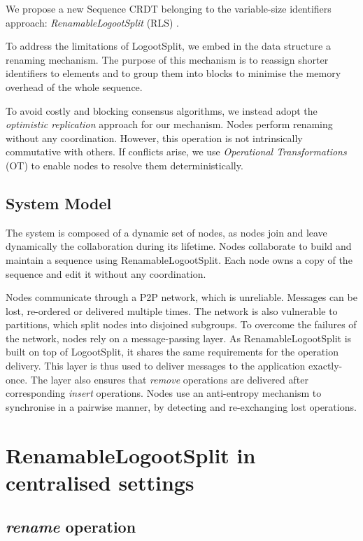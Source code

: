 \documentclass[10pt,journal,compsoc]{IEEEtran}
\begin{document}
We propose a new Sequence \ac{CRDT} belonging to the variable-size identifiers approach: \emph{RenamableLogootSplit} (RLS) \cite{nicolas:hal-01932552}.

To address the limitations of LogootSplit, we embed in the data structure a renaming mechanism.
The purpose of this mechanism is to reassign shorter identifiers to elements and to group them into blocks to minimise the memory overhead of the whole sequence.

To avoid costly and blocking consensus algorithms, we instead adopt the \emph{optimistic replication} \cite{10.1145/1057977.1057980} approach for our mechanism.
Nodes perform renaming without any coordination.
However, this operation is not intrinsically commutative with others.
If conflicts arise, we use \emph{Operational Transformations} (OT) \cite{10.1145/289444.289469,4668339} to enable nodes to resolve them deterministically.

\subsection{System Model}

The system is composed of a dynamic set of nodes, as nodes join and leave dynamically the collaboration during its lifetime.
Nodes collaborate to build and maintain a sequence using RenamableLogootSplit.
Each node owns a copy of the sequence and edit it without any coordination.

Nodes communicate through a \ac{P2P} network, which is unreliable.
Messages can be lost, re-ordered or delivered multiple times.
The network is also vulnerable to partitions, which split nodes into disjoined subgroups.
To overcome the failures of the network, nodes rely on a message-passing layer.
As RenamableLogootSplit is built on top of LogootSplit, it shares the same requirements for the operation delivery.
This layer is thus used to deliver messages to the application exactly-once.
The layer also ensures that \emph{remove} operations are delivered after corresponding \emph{insert} operations.
Nodes use an anti-entropy mechanism to synchronise in a pairwise manner, by detecting and re-exchanging lost operations.

\section{RenamableLogootSplit in centralised settings}
\label{sec:centralised-rls}

\subsection{\emph{rename} operation}
\end{document}
